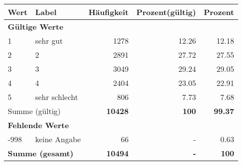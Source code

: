      \begin{longtable}{lXrrr}
     \toprule
     \textbf{Wert} & \textbf{Label} & \textbf{Häufigkeit} & \textbf{Prozent(gültig)} & \textbf{Prozent} \\
     \endhead
     \midrule
     \multicolumn{5}{l}{\textbf{Gültige Werte}}\\

     1 &
     \multicolumn{1}{X}{ sehr gut   } &


       \num{1278} &
       \num[round-mode=places,round-precision=2]{12.26} &
         \num[round-mode=places,round-precision=2]{12.18} \\

     2 &
     \multicolumn{1}{X}{ 2   } &


       \num{2891} &
       \num[round-mode=places,round-precision=2]{27.72} &
         \num[round-mode=places,round-precision=2]{27.55} \\

     3 &
     \multicolumn{1}{X}{ 3   } &


       \num{3049} &
       \num[round-mode=places,round-precision=2]{29.24} &
         \num[round-mode=places,round-precision=2]{29.05} \\

     4 &
     \multicolumn{1}{X}{ 4   } &


       \num{2404} &
       \num[round-mode=places,round-precision=2]{23.05} &
         \num[round-mode=places,round-precision=2]{22.91} \\

     5 &
     \multicolumn{1}{X}{ sehr schlecht   } &


       \num{806} &
       \num[round-mode=places,round-precision=2]{7.73} &
         \num[round-mode=places,round-precision=2]{7.68} \\
     \midrule
     \multicolumn{2}{l}{Summe (gültig)} &
       \textbf{\num{10428}} &
     \textbf{\num{100}} &
       \textbf{\num[round-mode=places,round-precision=2]{99.37}} \\
     \multicolumn{5}{l}{\textbf{Fehlende Werte}}\\
       -998 &
       keine Angabe &
         \num{66} &
        - &
         \num[round-mode=places,round-precision=2]{0.63} \\
     \midrule
     \multicolumn{2}{l}{\textbf{Summe (gesamt)}} &
          \textbf{\num{10494}} &
        \textbf{-} &
        \textbf{\num{100}} \\
     \bottomrule
     \end{longtable}
     

